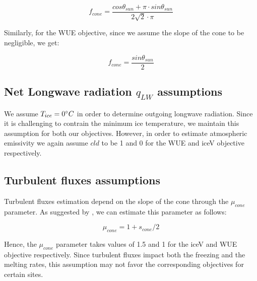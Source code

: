 \documentclass[tc, manuscript]{copernicus}
\begin{document}
\begin{equation}
		f_{cone} =\frac{ cos \theta_{sun} + \pi \cdot sin \theta_{sun} }{2\sqrt{2} \cdot \pi }
\end{equation}

Similarly, for the WUE objective, since we assume the slope of the cone to be negligible, we get:

\begin{equation}
		f_{cone} =\frac{ sin \theta_{sun} }{2 }
\end{equation}

\subsection{Net Longwave radiation \texorpdfstring{$q_{LW}$}{Lg} assumptions} \label{sec:LW}

We assume $T_{ice} = 0 ^{\circ} C$ in order to determine outgoing longwave radiation. Since it is challenging to
contrain the minimum ice temperature, we maintain this assumption for both our objectives. However, in order to
estimate atmospheric emissivity we again assume $cld$ to be 1 and 0 for the WUE and iceV objective respectively.

\subsection{Turbulent fluxes assumptions} \label{sec:Qs}

Turbulent fluxes estimation depend on the slope of the cone through the $\mu_{cone}$ parameter. As suggested 
by \citet{oerlemansBriefCommunicationGrowth2021}, we can estimate this parameter as follows:

\begin{equation}
  \mu_{cone} =1 + s_{cone}/2
\end{equation}

Hence, the $\mu_{cone}$ parameter takes values of 1.5 and 1 for the iceV and WUE objective respectively.  Since
turbulent fluxes impact both the freezing and the melting rates, this assumption may not favor the corresponding
objectives for certain sites.


\noappendix 



\end{document}
